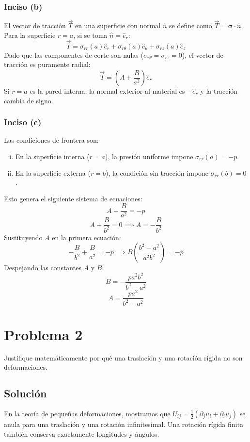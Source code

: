 \documentclass[a4paper]{article}
\begin{document}
\subsubsection*{Inciso (b)}
El vector de tracción $\vec{T}$ en una superficie con normal $\hat{n}$ se define como $\vec{T} = \boldsymbol{\sigma} \cdot \hat{n}$. Para la superficie $r=a$, si se toma $\hat{n}=\hat{e}_r$:
$$ \vec{T} = \sigma_{rr}(a)\hat{e}_r + \sigma_{r\theta}(a)\hat{e}_\theta + \sigma_{rz}(a)\hat{e}_z $$
Dado que las componentes de corte son nulas ($\sigma_{r\theta} = \sigma_{rz} = 0$), el vector de tracción es puramente radial:
$$ \vec{T} = \left(A + \frac{B}{a^2}\right) \hat{e}_r $$
Si $r=a$ es la pared interna, la normal exterior al material es $-\hat{e}_r$ y la tracción cambia de signo.

\subsubsection*{Inciso (c)}
Las condiciones de frontera son:
\begin{enumerate}[(i)]
    \item En la superficie interna ($r=a$), la presión uniforme impone $\sigma_{rr}(a)=-p$.
    \item En la superficie externa ($r=b$), la condición sin tracción impone $\sigma_{rr}(b)=0$.
\end{enumerate}

Esto genera el siguiente sistema de ecuaciones:
$$ A + \frac{B}{a^2} = -p $$
$$ A + \frac{B}{b^2} = 0 \implies A = -\frac{B}{b^2} $$
Sustituyendo $A$ en la primera ecuación:
$$ -\frac{B}{b^2} + \frac{B}{a^2} = -p \implies B \left(\frac{b^2 - a^2}{a^2 b^2}\right) = -p $$
Despejando las constantes $A$ y $B$:
$$ B = -\frac{p a^2 b^2}{b^2 - a^2} $$
$$ A = \frac{p a^2}{b^2 - a^2} $$

\section{Problema 2}

Justifique matemáticamente por qué una traslación y una rotación rígida no son deformaciones.


\subsection{Solución}
En la teoría de pequeñas deformaciones, mostramos que $U_{ij} = \frac{1}{2}(\partial_j u_i + \partial_i u_j)$ se anula para una traslación y una rotación infinitesimal. Una rotación rígida finita también conserva exactamente longitudes y ángulos.
\end{document}
